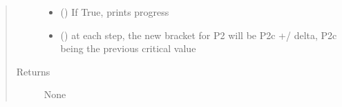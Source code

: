\documentclass[letterpaper,10pt,english]{sphinxmanual}
\begin{document}
\begin{fulllineitems}
\begin{quote}
\begin{description}
\begin{itemize}
\item {} 
\sphinxAtStartPar
{} () \textendash{} If True, prints progress

\item {} 
\sphinxAtStartPar
{} () \textendash{} at each step, the new bracket for P2 will be P2c +/\sphinxhyphen{} delta, P2c being the previous critical value

\end{itemize}

\item[{Returns}] \leavevmode
\sphinxAtStartPar
None

\end{description}\end{quote}

\end{fulllineitems}

\end{document}
